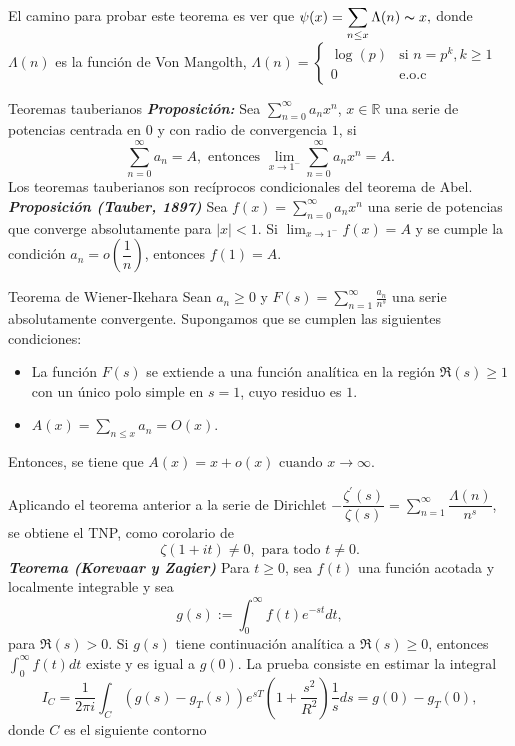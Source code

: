 \documentclass[final]{beamer}
\newcommand\R{\ensuremath{\mathbb{R}}}
\newlength{\colwidth}
\newcommand{\defi}[1]{\textbf{\emph{#1}}}
\begin{document}
\begin{frame}[t,fragile]
\begin{columns}[t]
\begin{column}{\colwidth}
\phantom{xd}\\\vspace*{0.6cm}
El camino para probar este teorema es ver que $\displaystyle\psi(x)=\sum_{n\leq x} \Lambda(n)\thicksim x,$ donde $\Lambda(n)$ es la función de Von Mangolth, $\displaystyle\Lambda(n)=\begin{cases}
    \log(p) &\text{si } n=p^k, k\geq 1\\
    0 &\text{e.o.c}
\end{cases}$
\begin{block}{Teoremas tauberianos}
\defi{Proposición: }Sea $\displaystyle \sum_{n=0}^{\infty} a_n x^n$, $x\in \R$ una serie de potencias centrada en $0$ y con radio  de convergencia $1$, si
$$\sum_{n=0}^{\infty} a_n=A,\text{ entonces } \lim_{x \to 1^-}\sum_{n=0}^{\infty} a_n x^n=A.$$
Los teoremas tauberianos son recíprocos condicionales del teorema de Abel.\\
\defi{Proposición (Tauber, 1897)} Sea $f(x)=\displaystyle\sum_{n=0}^{\infty} a_n x^n$ una serie de potencias que converge absolutamente para $|x|<1$.
Si $\lim_{x \rightarrow 1^{-}} f(x)=A$ y se cumple la condición $a_n=o\left(\dfrac{1}{n}\right)$, entonces $f(1)=A$.
\end{block}
\begin{exampleblock}{Teorema de Wiener-Ikehara}
Sean $a_n \geq 0$ y $F(s)=\displaystyle\sum_{n=1}^{\infty} \frac{a_n}{n^s}$ una serie absolutamente convergente. Supongamos que se cumplen las siguientes condiciones:
\begin{itemize}
\item La función $F(s)$ se extiende a una función analítica en la región $\Re(s) \geq 1$ con un único polo simple en $s=1$, cuyo residuo es $1$.\\
\item $A(x)=\displaystyle \sum_{n \leq x} a_n=O(x)$.
\end{itemize}
Entonces, se tiene que $A(x)=x+o(x) \text { cuando } x \rightarrow \infty \text {. }
$
\end{exampleblock}
Aplicando el teorema anterior a la serie de Dirichlet $\displaystyle-\dfrac{\zeta^{\prime}(s)}{\zeta(s)}=\sum_{n=1}^{\infty}\dfrac{\Lambda(n)}{n^s}$, se obtiene el TNP, como corolario de
$$\zeta(1+it)\neq 0, \text{ para todo } t\neq 0.$$
\defi{Teorema (Korevaar y Zagier)} Para $t \geq 0$, sea $f(t)$ una función acotada y localmente integrable y sea $$g(s):=\displaystyle\int_0^{\infty} f(t) e^{-s t} d t,$$
para $\Re(s)>0$. Si $g(s)$ tiene continuación analítica a $\Re(s) \geq 0$, entonces $\displaystyle\int_0^{\infty} f(t) d t$ existe y es igual a $g(0)$.
La prueba consiste en estimar la integral
$$I_{C}=\frac{1}{2\pi i}\int_{C}\left(g(s)-g_T(s)\right)e^{sT}\left(1+\frac{s^2}{R^2}\right)\frac{1}{s}ds=g(0)-g_T(0),$$
donde $C$ es el siguiente contorno
\begin{center}


\end{center}
\end{column}
\end{columns}
\end{frame}
\end{document}
